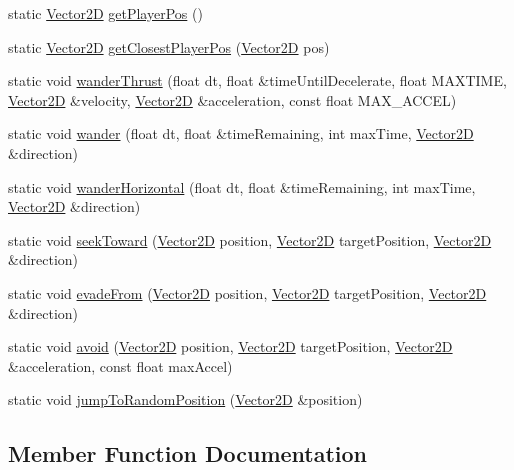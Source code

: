 \begin{DoxyCompactItemize}
$$static \hyperlink{class_vector2_d}{Vector2D} \hyperlink{class_a_i_manager_ae15963d08e5b13b33c44d2f018b7d53c}{get\+Player\+Pos} ()
\item 
static \hyperlink{class_vector2_d}{Vector2D} \hyperlink{class_a_i_manager_a1b2223e6059e0b5d303dbb1845ec252a}{get\+Closest\+Player\+Pos} (\hyperlink{class_vector2_d}{Vector2D} pos)
\item 
static void \hyperlink{class_a_i_manager_adac775408b1f5657948ac68876633ad6}{wander\+Thrust} (float dt, float \&time\+Until\+Decelerate, float M\+A\+X\+T\+I\+ME, \hyperlink{class_vector2_d}{Vector2D} \&velocity, \hyperlink{class_vector2_d}{Vector2D} \&acceleration, const float M\+A\+X\+\_\+\+A\+C\+C\+EL)
\item 
static void \hyperlink{class_a_i_manager_affdb0ecab44ebf429f5d8a3f08051416}{wander} (float dt, float \&time\+Remaining, int max\+Time, \hyperlink{class_vector2_d}{Vector2D} \&direction)
\item 
static void \hyperlink{class_a_i_manager_a130f5f0727fd01841265946e533de685}{wander\+Horizontal} (float dt, float \&time\+Remaining, int max\+Time, \hyperlink{class_vector2_d}{Vector2D} \&direction)
\item 
static void \hyperlink{class_a_i_manager_af83d3d5dc2b853811b92c463a88e434f}{seek\+Toward} (\hyperlink{class_vector2_d}{Vector2D} position, \hyperlink{class_vector2_d}{Vector2D} target\+Position, \hyperlink{class_vector2_d}{Vector2D} \&direction)
\item 
static void \hyperlink{class_a_i_manager_a9b04dd523dfb195990b365bacfcd1e92}{evade\+From} (\hyperlink{class_vector2_d}{Vector2D} position, \hyperlink{class_vector2_d}{Vector2D} target\+Position, \hyperlink{class_vector2_d}{Vector2D} \&direction)
\item 
static void \hyperlink{class_a_i_manager_ad4c0ad994de9e3d1a4780dd4050da257}{avoid} (\hyperlink{class_vector2_d}{Vector2D} position, \hyperlink{class_vector2_d}{Vector2D} target\+Position, \hyperlink{class_vector2_d}{Vector2D} \&acceleration, const float max\+Accel)
\item 
static void \hyperlink{class_a_i_manager_a96ee060f8e8d6f01280c2eff2d66ea6a}{jump\+To\+Random\+Position} (\hyperlink{class_vector2_d}{Vector2D} \&position)
\end{DoxyCompactItemize}


\subsection{Member Function Documentation}
\hypertarget{class_a_i_manager_afe3cf14648ae243d21f4cabaa8cc2ec1}{}\label{class_a_i_manager_afe3cf14648ae243d21f4cabaa8cc2ec1} 
